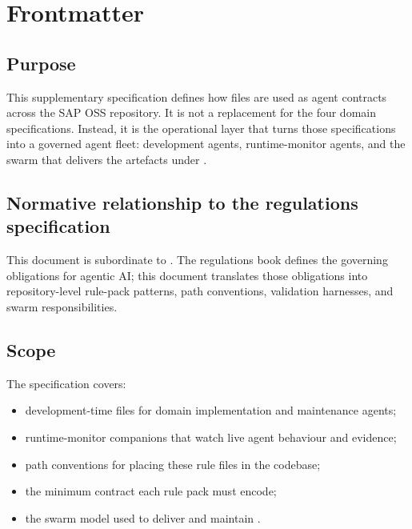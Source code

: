\chapter{Frontmatter}
\label{ch:frontmatter}

\tableofcontents
\clearpage

\section{Purpose}

This supplementary specification defines how 
files are used as agent contracts across the SAP OSS repository. It is
not a replacement for the four domain specifications. Instead, it is
the operational layer that turns those specifications into a governed
agent fleet: development agents, runtime-monitor agents, and the swarm
that delivers the artefacts under .

\section{Normative relationship to the regulations specification}

This document is subordinate to
. The regulations book
defines the governing obligations for agentic AI; this document
translates those obligations into repository-level rule-pack patterns,
path conventions, validation harnesses, and swarm responsibilities.

\section{Scope}

The specification covers:
\begin{itemize}
  \item development-time  files for domain
    implementation and maintenance agents;
  \item runtime-monitor  companions that watch
    live agent behaviour and evidence;
  \item path conventions for placing these rule files in the codebase;
  \item the minimum contract each rule pack must encode;
  \item the swarm model used to deliver and maintain
    .
\end{itemize}

